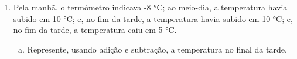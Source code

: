 \documentclass[a4paper,14pt]{article}
\begin{document}
\begin{multicols}{2}
\begin{enumerate}
\begin{enumerate}[a)]
				\item -23 + 4 - 8 - 32 - 12 + 86 \\\\\\\\\\\\
				\small \item 1 + 3 - 4 + 8 - 9 + 6 - 52 + 31 \\\\\\\\\\\\
				\normalsize \item 5 + 7 - 23 + 14 - 13 \\\\\\\\\\\\
				\item 4 + 2 - 3 + 8 - 12 \\\\\\\\\\\\
				\item -9 + 15 - 12 + 3 - 2 \newpage
				\item 8 - 120 + 15 - 95 + 78 \\\\\\\\\\\\
			\end{enumerate}
			\item Pela manhã, o termômetro indicava -8 °C; ao meio-dia, a temperatura havia subido em 10 °C; e, no fim da tarde, a temperatura havia subido em 10 °C; e, no fim da tarde, a temperatura caiu em 5 °C.
			\begin{enumerate}[a)]
				\item Represente, usando adição e subtração, a temperatura no final da tarde. \\\\\\\\\\\\\\\\\\\\

\end{enumerate}
\end{enumerate}
\end{multicols}
\end{document}
